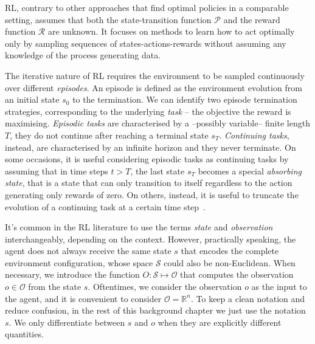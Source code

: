 \acl{RL}, contrary to other approaches that find optimal policies in a comparable setting, assumes that both the state-transition function $\mathcal{P}$ and the reward function $\mathcal{R}$ are unknown.
It focuses on methods to learn how to act optimally only by sampling sequences of states-actions-rewards without assuming any knowledge of the process generating data.

\begin{remark*}
%
The iterative nature of \ac{RL} requires the environment to be sampled continuously over different \emph{episodes}.
An episode is defined as the environment evolution from an initial state $s_0$ to the termination.
We can identify two episode termination strategies, corresponding to the underlying \emph{task} -- the objective the reward is maximising.
\emph{Episodic tasks} are characterised by a --possibly variable-- finite length $T$, \ie they do not continue after reaching a terminal state $s_T$.
\emph{Continuing tasks}, instead, are characterised by an infinite horizon and they never terminate.
On some occasions, it is useful considering episodic tasks as continuing tasks by assuming that in time steps $t > T$, the last state $s_T$ becomes a special \emph{absorbing state}, that is a state that can only transition to itself regardless to the action generating only rewards of zero.
On others, instead, it is useful to truncate the evolution of a continuing task at a certain time step~\parencite{pardo_time_2022}.
%
\end{remark*}

\begin{remark*}
%
It's common in the \ac{RL} literature to use the terms \emph{state} and \emph{observation} interchangeably, depending on the context.
However, practically speaking, the agent does not always receive the same state $s$ that encodes the complete environment configuration, whose space $\mathcal{S}$ could also be non-Euclidean.
When necessary, we introduce the function $O: \mathcal{S} \mapsto \mathcal{O}$ that computes the observation $o \in \mathcal{O}$ from the state $s$.
Oftentimes, we consider the observation $o$ as the input to the agent, and it is convenient to consider $\mathcal{O} = \mathbb{R}^n$.
To keep a clean notation and reduce confusion, in the rest of this background chapter we just use the notation $s$.
We only differentiate between $s$ and $o$ when they are explicitly different quantities.
%
\end{remark*}

